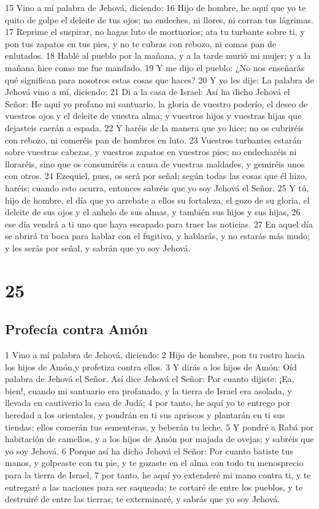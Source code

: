 15 Vino a mí palabra de Jehová, diciendo:
16 Hijo de hombre, he aquí que yo te quito de golpe el deleite de tus ojos; no endeches, ni llores, ni corran tus lágrimas.
17 Reprime el suspirar, no hagas luto de mortuorios; ata tu turbante sobre ti, y pon tus zapatos en tus pies, y no te cubras con rebozo, ni comas pan de enlutados.
18 Hablé al pueblo por la mañana, y a la tarde murió mi mujer; y a la mañana hice como me fue mandado.
19 Y me dijo el pueblo: ¿No nos enseñarás qué significan para nosotros estas cosas que haces?
20 Y yo les dije: La palabra de Jehová vino a mí, diciendo:
21 Di a la casa de Israel: Así ha dicho Jehová el Señor: He aquí yo profano mi santuario, la gloria de vuestro poderío, el deseo de vuestros ojos y el deleite de vuestra alma; y vuestros hijos y vuestras hijas que dejasteis caerán a espada.
22 Y haréis de la manera que yo hice; no os cubriréis con rebozo, ni comeréis pan de hombres en luto.
23 Vuestros turbantes estarán sobre vuestras cabezas, y vuestros zapatos en vuestros pies; no endecharéis ni lloraréis, sino que os consumiréis a causa de vuestras maldades, y gemiréis unos con otros.
24 Ezequiel, pues, os será por señal; según todas las cosas que él hizo, haréis; cuando esto ocurra, entonces sabréis que yo soy Jehová el Señor.
25 Y tú, hijo de hombre, el día que yo arrebate a ellos su fortaleza, el gozo de su gloria, el deleite de sus ojos y el anhelo de sus almas, y también sus hijos y sus hijas,
26 ese día vendrá a ti uno que haya escapado para traer las noticias.
27 En aquel día se abrirá tu boca para hablar con el fugitivo, y hablarás, y no estarás más mudo; y les serás por señal, y sabrán que yo soy Jehová.

\chapter{25}

\section*{Profecía contra Amón}

1 Vino a mí palabra de Jehová, diciendo:
2 Hijo de hombre, pon tu rostro hacia los hijos de Amón,y profetiza contra ellos.
3 Y dirás a los hijos de Amón: Oíd palabra de Jehová el Señor. Así dice Jehová el Señor: Por cuanto dijiste: ¡Ea, bien!, cuando mi santuario era profanado, y la tierra de Israel era asolada, y llevada en cautiverio la casa de Judá; 
4 por tanto, he aquí yo te entrego por heredad a los orientales, y pondrán en ti sus apriscos y plantarán en ti sus tiendas; ellos comerán tus sementeras, y beberán tu leche.
5 Y pondré a Rabá por habitación de camellos, y a los hijos de Amón por majada de ovejas; y sabréis que yo soy Jehová.
6 Porque así ha dicho Jehová el Señor: Por cuanto batiste tus manos, y golpeaste con tu pie, y te gozaste en el alma con todo tu menosprecio para la tierra de Israel,
7 por tanto, he aquí yo extenderé mi mano contra ti, y te entregaré a las naciones para ser saqueada; te cortaré de entre los pueblos, y te destruiré de entre las tierras; te exterminaré, y sabrás que yo soy Jehová.

